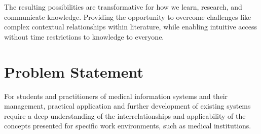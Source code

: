 The resulting possibilities are transformative for how we learn, research, and communicate knowledge.
Providing the opportunity to overcome challenges like complex contextual relationships within literature, while enabling intuitive access without time restrictions to knowledge to everyone.

\section{Problem Statement}\label{sec:problem statement}
For students and practitioners of medical information systems and their management, practical application and further development of existing systems require a deep understanding of the interrelationships and applicability of the concepts presented for specific work environments, such as medical institutions.

